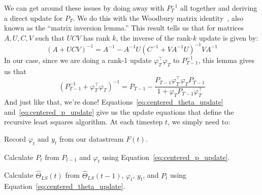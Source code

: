 We can get around these issues by doing away with $P_T^{-1}$ all together and
deriving a direct update for $P_T$. We do this with the Woodbury matrix
identity~\cite{woodbury1950inverting}, also known as the ``matrix inversion
lemma.'' This result tells us that for matrices $A, U, C, V$ such that $UCV$ has rank $k$, the inverse of the rank-$k$ update is given by:
\begin{equation}
  \label{eq:woodbury}
  \left(A + UCV\right)^{-1} = A^{-1} - A^{-1}U\left(C^{-1} + VA^{-1}U\right)^{-1}VA^{-1}
\end{equation}
In our case, since we are doing a rank-1 update $\varphi_T^\top \varphi_T$ to
$P_{T-1}^{-1}$, this lemma gives us that
\begin{equation}
  \label{eq:centered_p_update}
  \left(P_{T-1}^{-1} + \varphi_T^\top \varphi_T\right)^{-1} = P_{T - 1} - \frac{P_{T-1}\varphi_T^\top \varphi_T P_{T-1}}{1 + \varphi_T P_{T-1} \varphi_T^\top}
\end{equation}
And just like that, we're done! Equations~\ref{eq:centered_theta_update}
and~\ref{eq:centered_p_update} give us the update equations that define the
recursive least squares algorithm. At each timestep $t$, we simply need to:
\begin{enumerate}
\begin{singlespace}
  \item Record $\varphi_t$ and $y_t$ from our datastream $F(t)$. 
  \item Calculate $P_t$ from $P_{t-1}$ and $\varphi_t$ using Equation~\ref{eq:centered_p_update}. 
  \item Calculate $\hat\Theta_{LS}(t)$ from $\hat\Theta_{LS}(t-1)$, $\varphi_t$, $y_t$, and $P_{t}$ using Equation~\ref{eq:centered_theta_update}. 
\end{singlespace}
\end{enumerate}
